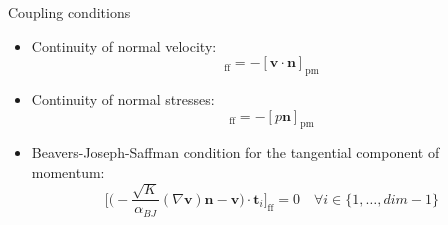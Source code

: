 \documentclass{beamer}
\begin{document}
\begin{frame}{Coupling conditions}
\begin{itemize}
	\item Continuity of normal velocity:
	\begin{equation*}
	[\mathbf{v} \cdot \mathbf{n}]_\text{ff} = - [\mathbf{v} 
	\cdot \mathbf{n}]_\text{pm}
	\end{equation*}
	\item Continuity of normal stresses:
	\begin{equation*}
	[(\varrho \mathbf{v} \mathbf{v}^\mathrm{T} - (\mu + \mu_t) \nabla 
	\mathbf{v} + p\mathbf{I}) 
	\mathbf{n}]_\text{ff} = 
	- [p\mathbf{n}]_\text{pm}
	\end{equation*}
	\item Beavers-Joseph-Saffman condition for the tangential component of 
	momentum:
	\begin{equation*}
	\bigg[ \bigg( -\frac{\sqrt{K}}{\alpha_{BJ}} (\nabla \mathbf{v}) 
	\mathbf{n} - \mathbf{v} \bigg) \cdot \mathbf{t}_i \bigg]_\text{ff} = 0 
	\quad \forall i \in \{1, \dots, dim - 1\}
	\end{equation*}
\end{itemize}
\end{frame}
\end{document}
